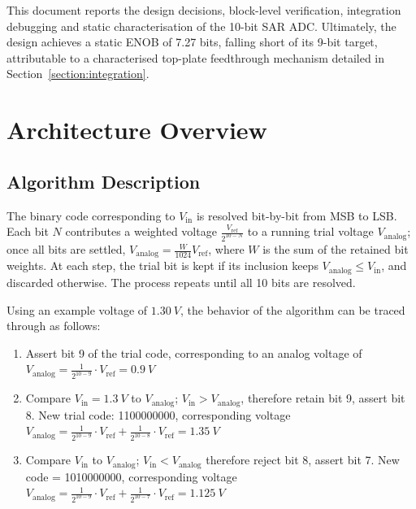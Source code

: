 \documentclass[12pt, a4paper]{article}
\begin{document}
This document reports the design decisions, block-level verification, integration debugging and static characterisation of the 10-bit SAR ADC. Ultimately, the design achieves a static ENOB of 7.27 bits, falling short of its 9-bit target, attributable to a characterised top-plate feedthrough mechanism detailed in Section~\ref{section:integration}.

\section{Architecture Overview}
\label{section:architecture}

\subsection{Algorithm Description}
The binary code corresponding to $V_\mathrm{in}$ is resolved bit-by-bit from MSB to LSB. Each bit $N$ contributes a weighted voltage $\frac{V_\mathrm{ref}}{2^{10-N}}$ to a running trial voltage $V_\mathrm{analog}$; once all bits are settled, $V_\mathrm{analog} = \frac{W}{1024} V_\mathrm{ref}$, where $W$ is the sum of the retained bit weights. At each step, the trial bit is kept if its inclusion keeps $V_\mathrm{analog} \leq V_\mathrm{in}$, and discarded otherwise. The process repeats until all 10 bits are resolved.

Using an example voltage of $\qty{1.30}{V}$, the behavior of the algorithm can be traced through as follows:

\begin{enumerate}
    \item Assert bit 9 of the trial code, corresponding to an analog voltage of $V_\mathrm{analog} = \frac{1}{2^{10-9}} \cdot V_\mathrm{ref} = \qty{0.9}{V}$
    \item Compare $V_\mathrm{in} = \qty{1.3}{V}$ to $V_\mathrm{analog}$; $V_\mathrm{in} > V_\mathrm{analog}$, therefore retain bit 9, assert bit 8. New trial code: 1100000000, corresponding voltage $V_\mathrm{analog} = \frac{1}{2^{10-9}} \cdot V_\mathrm{ref} + \frac{1}{2^{10-8}} \cdot V_\mathrm{ref} = \qty{1.35}{V}$
    \item Compare $V_\mathrm{in}$ to $V_\mathrm{analog}$; $V_\mathrm{in} < V_\mathrm{analog}$ therefore reject bit 8, assert bit 7. New code = 1010000000, corresponding voltage $V_\mathrm{analog} = \frac{1}{2^{10-9}} \cdot V_\mathrm{ref} + \frac{1}{2^{10-7}} \cdot V_\mathrm{ref} = \qty{1.125}{V}$
\end{enumerate}
\end{document}
